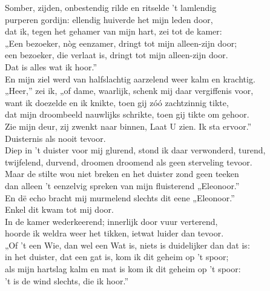 \documentclass{memoir}
\begin{document}
\begin{multicols}{2}
\noindent Somber, zijden, onbestendig rilde en ritselde 't lamlendig\\
purperen gordijn: ellendig huiverde het mijn leden door,\\
dat ik, tegen het gehamer van mijn hart, zei tot de kamer:\\
„Een bezoeker, nòg eenzamer, dringt tot mijn alleen-zijn door;\\
een bezoeker, die verlaat is, dringt tot mijn alleen-zijn door.\\
\indent\indent Dat is alles wat ik hoor.”\\

\noindent En mijn ziel werd van halfslachtig aarzelend weer kalm en krachtig.\\
„Heer,” zei ik, „of dame, waarlijk, schenk mij daar vergiffenis voor,\\
want ik doezelde en ik knikte, toen gij zóó zachtzinnig tikte,\\
dat mijn droombeeld nauwlijks schrikte, toen gij tikte om gehoor.\\
Zie mijn deur, zij zwenkt naar binnen, Laat U zien. Ik sta ervoor.”\\
\indent\indent Duisternis als nooit tevoor.\\

\noindent Diep in 't duister voor mij glurend, stond ik daar verwonderd, turend,\\
twijfelend, durvend, droomen droomend als geen sterveling tevoor.\\
Maar de stilte wou niet breken en het duister zond geen teeken\\
dan alleen 't eenzelvig spreken van mijn fluisterend „Eleonoor.”\\
En dë echo bracht mij murmelend slechts dit eene „Eleonoor.”\\
\indent\indent Enkel dit kwam tot mij door.\\

\noindent In de kamer wederkeerend; innerlijk door vuur verterend,\\
hoorde ik weldra weer het tikken, ietwat luider dan tevoor.\\
„Of 't een Wie, dan wel een Wat is, niets is duidelijker dan dat is:\\
in het duister, dat een gat is, kom ik dit geheim op 't spoor;\\
als mijn hartslag kalm en mat is kom ik dit geheim op 't spoor:\\
\indent\indent 't is de wind slechts, die ik hoor.”\\


\end{multicols}
\end{document}
